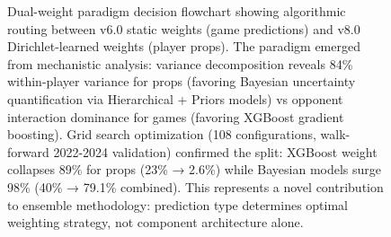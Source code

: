 \begin{figure}[htbp]
\caption{Dual-weight paradigm decision flowchart showing algorithmic routing between v6.0 static weights (game predictions) and v8.0 Dirichlet-learned weights (player props). The paradigm emerged from mechanistic analysis: variance decomposition reveals 84\% within-player variance for props (favoring Bayesian uncertainty quantification via Hierarchical + Priors models) vs opponent interaction dominance for games (favoring XGBoost gradient boosting). Grid search optimization (108 configurations, walk-forward 2022-2024 validation) confirmed the split: XGBoost weight collapses 89\% for props (23\% → 2.6\%) while Bayesian models surge 98\% (40\% → 79.1\% combined). This represents a novel contribution to ensemble methodology: prediction type determines optimal weighting strategy, not component architecture alone.}
\label{fig:dual-weight-decision-flowchart}
\end{figure}
